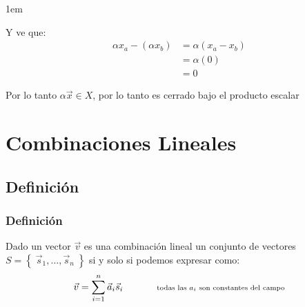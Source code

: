 \documentclass[12pt, fleqn]{report}                             %
\newenvironment{SmallIndentation}[1][0.75em]                    %
        {\begin{adjustwidth}{#1}{}\begin{footnotesize}}             %
        {\end{footnotesize}\end{adjustwidth}}                       %
\DeclareMathOperator \Space {\quad}                             %
\DeclareMathOperator \MegaSpace {\quad \quad}                   %
\newcommand \Remember[1]{\Space\text{\scriptsize{#1}}}          %
\theoremstyle{break}                                            %
\newcommand{\Set}[1]    {\left\{ \; #1 \; \right\}}             %
\begin{document}
\begin{itemize}
\begin{SmallIndentation}[1em]
\begin{itemize}
                                Y ve que:
                                \begin{align*}
                                    \alpha x_a - (\alpha x_b)
                                        &= \alpha (x_a - x_b)               \\
                                        &= \alpha (0)                       \\
                                        &= 0
                                \end{align*}

                                Por lo tanto $\alpha \vec x \in X$, por lo tanto es cerrado bajo el producto escalar

                        \end{itemize}

                    \end{SmallIndentation}

            \end{itemize}



    \chapter{Combinaciones Lineales}

        \clearpage
        \section{Definición}

            \subsection{Definición}

                Dado un vector $\vec v$ es una combinación lineal un conjunto de
                vectores $S = \Set{\vec s_1, \dots, \vec s_n}$ si y solo si
                podemos expresar como:
                \begin{equation*}
                    \vec v = \sum_{i = 1}^n \vec a_i \vec s_i
                    \MegaSpace
                    \Remember{todas las $a_i$ son constantes del campo}
                \end{equation*}
\end{document}
